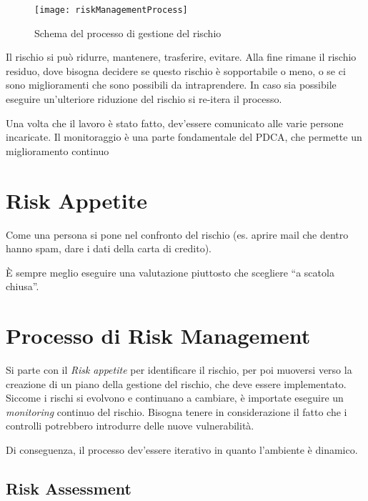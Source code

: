 \begin{figure}[H]
 \centering
 \texttt{[image: riskManagementProcess]}
 \caption{Schema del processo di gestione del rischio}
\end{figure}

Il rischio si può ridurre, mantenere, trasferire, evitare. Alla fine rimane il
rischio residuo, dove bisogna decidere se questo rischio è sopportabile o meno,
o se ci sono miglioramenti che sono possibili da intraprendere. In caso sia
possibile eseguire un'ulteriore riduzione del rischio si re-itera il processo.

Una volta che il lavoro è stato fatto, dev'essere comunicato alle varie
persone incaricate. Il monitoraggio è una parte fondamentale del PDCA, che
permette un miglioramento continuo

\section{Risk Appetite}

Come una persona si pone nel confronto del rischio (es. aprire mail che dentro
hanno spam, dare i dati della carta di credito).

È sempre meglio eseguire una valutazione piuttosto che scegliere
``a scatola chiusa''.


\section{Processo di Risk Management}

Si parte con il \textit{Risk appetite} per identificare il rischio, per poi
muoversi verso la creazione di un piano della gestione del rischio, che deve 
essere implementato. Siccome i rischi si evolvono e continuano a
cambiare, è importate eseguire un \textit{monitoring} continuo del rischio. 
Bisogna tenere in considerazione il fatto che i controlli potrebbero
introdurre delle nuove vulnerabilità.

Di conseguenza, il processo dev'essere iterativo in quanto l'ambiente è
dinamico.


\subsection{Risk Assessment}

